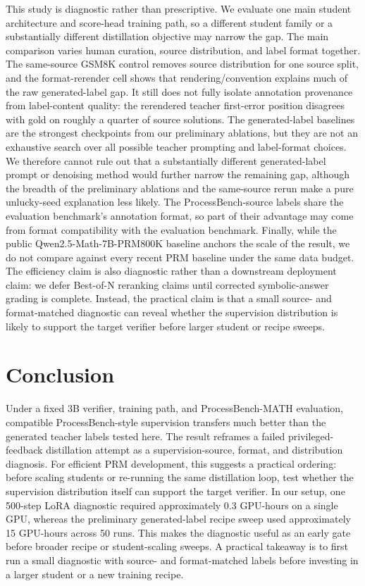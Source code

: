 \documentclass{article}
\begin{document}
This study is diagnostic rather than prescriptive.
We evaluate one main student architecture and score-head training path, so a different student family or a substantially different distillation objective may narrow the gap.
The main comparison varies human curation, source distribution, and label format together.
The same-source GSM8K control removes source distribution for one source split, and the format-rerender cell shows that rendering/convention explains much of the raw generated-label gap.
It still does not fully isolate annotation provenance from label-content quality: the rerendered teacher first-error position disagrees with gold on roughly a quarter of source solutions.
The generated-label baselines are the strongest checkpoints from our preliminary ablations, but they are not an exhaustive search over all possible teacher prompting and label-format choices.
We therefore cannot rule out that a substantially different generated-label prompt or denoising method would further narrow the remaining gap, although the breadth of the preliminary ablations and the same-source rerun make a pure unlucky-seed explanation less likely.
The ProcessBench-source labels share the evaluation benchmark's annotation format, so part of their advantage may come from format compatibility with the evaluation benchmark.
Finally, while the public Qwen2.5-Math-7B-PRM800K baseline anchors the scale of the result, we do not compare against every recent PRM baseline under the same data budget.
The efficiency claim is also diagnostic rather than a downstream deployment claim: we defer Best-of-N reranking claims until corrected symbolic-answer grading is complete.
Instead, the practical claim is that a small source- and format-matched diagnostic can reveal whether the supervision distribution is likely to support the target verifier before larger student or recipe sweeps.

\section{Conclusion}

Under a fixed 3B verifier, training path, and ProcessBench-MATH evaluation, compatible ProcessBench-style supervision transfers much better than the generated teacher labels tested here.
The result reframes a failed privileged-feedback distillation attempt as a supervision-source, format, and distribution diagnosis.
For efficient PRM development, this suggests a practical ordering: before scaling students or re-running the same distillation loop, test whether the supervision distribution itself can support the target verifier.
In our setup, one 500-step LoRA diagnostic required approximately 0.3 GPU-hours on a single GPU, whereas the preliminary generated-label recipe sweep used approximately 15 GPU-hours across 50 runs.
This makes the diagnostic useful as an early gate before broader recipe or student-scaling sweeps.
A practical takeaway is to first run a small diagnostic with source- and format-matched labels before investing in a larger student or a new training recipe.
\end{document}
